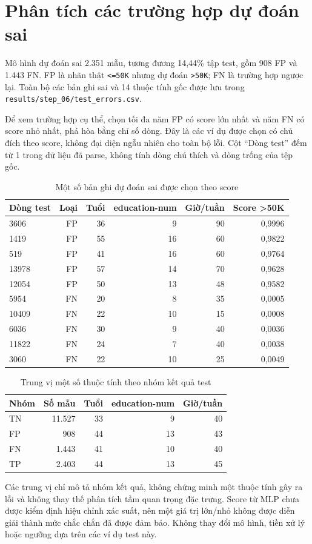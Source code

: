 \section{Phân tích các trường hợp dự đoán sai}
\label{sec:6_6}
Mô hình dự đoán sai 2.351 mẫu, tương đương 14,44\% tập test, gồm 908 FP và 1.443 FN. FP là nhãn thật \texttt{<=50K} nhưng dự đoán \texttt{>50K}; FN là trường hợp ngược lại. Toàn bộ các bản ghi sai và 14 thuộc tính gốc được lưu trong \texttt{results/step\_06/test\_errors.csv}.

Để xem trường hợp cụ thể, chọn tối đa năm FP có score lớn nhất và năm FN có score nhỏ nhất, phá hòa bằng chỉ số dòng. Đây là các ví dụ được chọn có chủ đích theo score, không đại diện ngẫu nhiên cho toàn bộ lỗi. Cột ``Dòng test'' đếm từ 1 trong dữ liệu đã parse, không tính dòng chú thích và dòng trống của tệp gốc.

\begin{table}[htbp]
\centering\scriptsize
\caption{Một số bản ghi dự đoán sai được chọn theo score}\label{tab:test-error-examples}
\begin{tabular}{lrrrrr}
\toprule
Dòng test & Loại & Tuổi & education-num & Giờ/tuần & Score >50K \\
\midrule
3606 & FP & 36 & 9 & 90 & 0,9996 \\
1419 & FP & 55 & 16 & 60 & 0,9822 \\
519 & FP & 41 & 16 & 60 & 0,9764 \\
13978 & FP & 57 & 14 & 70 & 0,9628 \\
12054 & FP & 50 & 13 & 48 & 0,9582 \\
5954 & FN & 20 & 8 & 35 & 0,0005 \\
10409 & FN & 22 & 10 & 15 & 0,0008 \\
6036 & FN & 30 & 9 & 40 & 0,0036 \\
11822 & FN & 24 & 7 & 40 & 0,0038 \\
3060 & FN & 22 & 10 & 25 & 0,0049 \\
\bottomrule
\end{tabular}
\end{table}
\begin{table}[htbp]
\centering\small
\caption{Trung vị một số thuộc tính theo nhóm kết quả test}\label{tab:test-error-profiles}
\begin{tabular}{lrrrr}
\toprule
Nhóm & Số mẫu & Tuổi & education-num & Giờ/tuần \\
\midrule
TN & 11.527 & 33 & 9 & 40 \\
FP & 908 & 44 & 13 & 43 \\
FN & 1.443 & 41 & 10 & 40 \\
TP & 2.403 & 44 & 13 & 45 \\
\bottomrule
\end{tabular}
\end{table}
Các trung vị chỉ mô tả nhóm kết quả, không chứng minh một thuộc tính gây ra lỗi và không thay thế phân tích tầm quan trọng đặc trưng. Score từ MLP chưa được kiểm định hiệu chỉnh xác suất, nên một giá trị lớn/nhỏ không được diễn giải thành mức chắc chắn đã được đảm bảo. Không thay đổi mô hình, tiền xử lý hoặc ngưỡng dựa trên các ví dụ test này.
